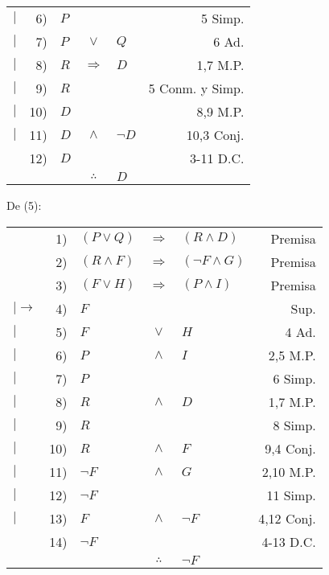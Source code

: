\documentclass[12pt]{report}
\theoremstyle{largebreak}
\begin{document}
\begin{sol}
\begin{center}
\begin{tabular}{l r l c l r}
                $|$ & 6) & $P$ &  &  & 5 Simp. \\
                $|$ & 7) & $P$ & $\lor$ & $Q$ & 6 Ad. \\
                $|$ & 8) & $R$ & $\Rightarrow$ & $D$ & 1,7 M.P. \\
                $|$ & 9) & $R$ &  &  & 5 Conm. y Simp. \\
                $|$ & 10) & $D$ &  &  & 8,9 M.P. \\
                $|$ & 11) & $D$ & $\land$ & $\neg D$ & 10,3 Conj. \\
                \hline
                & 12) & $D$ &  &  & 3-11 D.C.\\
                \hline
                & & & $\therefore$ & $D$ & \\
            \end{tabular}
        \end{center}
        De (5):
        \begin{center}
            \begin{tabular}{l r l c l r}
                & 1) & $(P\lor Q)$ & $\Rightarrow$ & $(R\land D)$ & Premisa \\
                & 2) & $(R\land F)$ & $\Rightarrow$ & $(\neg F\land G)$ & Premisa \\
                & 3) & $(F\lor H)$ & $\Rightarrow$ & $(P\land I)$ & Premisa \\
                $|\longrightarrow$& 4) & $F$ &  &  & Sup. \\
                $|$& 5) & $F$ & $\lor$ & $H$ & 4 Ad. \\
                $|$& 6) & $P$ & $\land$ & $I$ & 2,5 M.P. \\
                $|$& 7) & $P$ &  &  & 6 Simp. \\
                $|$& 8) & $R$ & $\land$ & $D$ & 1,7 M.P. \\
                $|$& 9) & $R$ &  &  & 8 Simp. \\
                $|$& 10) & $R$ & $\land$ & $F$ & 9,4 Conj. \\
                $|$& 11) & $\neg F$ & $\land$ & $G$ & 2,10 M.P. \\
                $|$& 12) & $\neg F$ &  &  & 11 Simp. \\
                $|$& 13) & $F$ & $\land$ & $\neg F$ & 4,12 Conj. \\
                \hline
                & 14) & $\neg F$ &  &  & 4-13 D.C. \\
                \hline
                & & & $\therefore$ & $\neg F$ & \\
            \end{tabular}
        \end{center}
    \end{sol}
\end{document}
